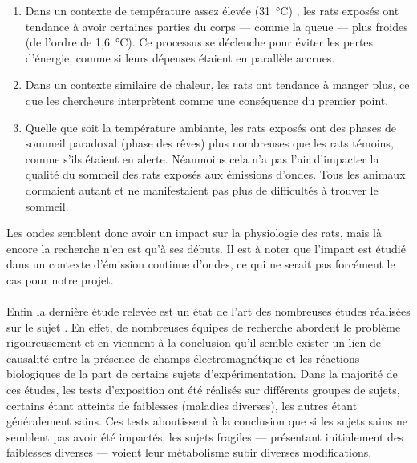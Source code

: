     \begin{enumerate}
        \item Dans un contexte de température assez élevée (31~°C) , les rats exposés ont tendance à avoir certaines parties du corps --- comme la queue --- plus froides (de l'ordre de 1,6~°C). Ce processus se déclenche pour éviter les pertes d'énergie, comme si leurs dépenses étaient en parallèle accrues.
        \item Dans un contexte similaire de chaleur, les rats ont tendance à manger plus, ce que les chercheurs interprètent comme une conséquence du premier point.
        \item Quelle que soit la température ambiante, les rats exposés ont des phases de sommeil paradoxal (phase des rêves) plus nombreuses que les rats témoins, comme s'ils étaient en alerte. Néanmoins cela n'a pas l'air d'impacter la qualité du sommeil des rats exposés aux émissions d'ondes. Tous les animaux dormaient autant et ne manifestaient pas plus de difficultés à trouver le sommeil.
    \end{enumerate}
    Les ondes semblent donc avoir un impact sur la physiologie des rats, mais là encore la recherche n'en est qu'à ses débuts. Il est à noter que l'impact est étudié dans un contexte d'émission continue d'ondes, ce qui ne serait pas forcément le cas pour notre projet.
    
   
    \paragraph{}Enfin la dernière étude relevée est un état de l'art des nombreuses études réalisées sur le sujet \cite{SAY201670}. En effet, de nombreuses équipes de recherche abordent le problème rigoureusement et en viennent à la conclusion qu'il semble exister un lien de causalité entre la présence de champs électromagnétique et les réactions biologiques de la part de certains sujets d'expérimentation. Dans la majorité de ces études, les tests d'exposition ont été réalisés sur différents groupes de sujets, certains étant atteints de faiblesses (maladies diverses),  les autres étant généralement sains. Ces tests aboutissent à la conclusion que si les sujets sains ne semblent pas avoir été impactés, les sujets fragiles --- présentant initialement des faiblesses diverses --- voient leur métabolisme subir diverses modifications.
    
    
